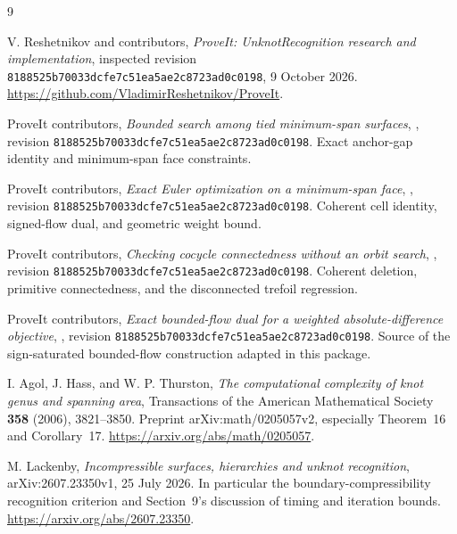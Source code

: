 \documentclass[11pt,letterpaper]{article}
\theoremstyle{definition}
\newcommand{\snap}{8188525b70033dcfe7c51ea5ae2c8723ad0c0198}
\begin{document}
\bigskip
{}
\begin{thebibliography}{9}
\small\raggedright
\setlength{\itemsep}{3pt}\setlength{\parskip}{0pt}
V. Reshetnikov and contributors, \emph{ProveIt: UnknotRecognition research and implementation}, inspected revision \texttt{\snap}, 9 October 2026.\newline
\url{https://github.com/VladimirReshetnikov/ProveIt}.

ProveIt contributors, \emph{Bounded search among tied minimum-span surfaces},
, revision \texttt{\snap}. Exact anchor-gap identity and minimum-span face constraints.

ProveIt contributors, \emph{Exact Euler optimization on a minimum-span face},
, revision \texttt{\snap}. Coherent cell identity, signed-flow dual, and geometric weight bound.

ProveIt contributors, \emph{Checking cocycle connectedness without an orbit search},
, revision \texttt{\snap}. Coherent deletion, primitive connectedness, and the disconnected trefoil regression.

ProveIt contributors, \emph{Exact bounded-flow dual for a weighted absolute-difference objective},
, revision \texttt{\snap}. Source of the sign-saturated bounded-flow construction adapted in this package.

I. Agol, J. Hass, and W. P. Thurston, \emph{The computational complexity of knot genus and spanning area}, Transactions of the American Mathematical Society \textbf{358} (2006), 3821--3850. Preprint arXiv:math/0205057v2, especially Theorem~16 and Corollary~17.\newline
\url{https://arxiv.org/abs/math/0205057}.

M. Lackenby, \emph{Incompressible surfaces, hierarchies and unknot recognition}, arXiv:2607.23350v1, 25 July 2026. In particular the boundary-compressibility recognition criterion and Section~9's discussion of timing and iteration bounds.\newline
\url{https://arxiv.org/abs/2607.23350}.
\end{thebibliography}
\end{document}
